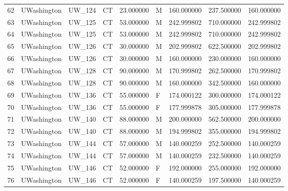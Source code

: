 \begin{tabular}{llllrlrrr}
62     &     UWashington &       UW\_124 &                 CT &  23.000000 &        M &       160.000000 &    237.500000 &  160.000000 \\
63     &     UWashington &       UW\_125 &                 CT &  53.000000 &        M &       242.999802 &    710.000000 &  242.999802 \\
64     &     UWashington &       UW\_125 &                 CT &  53.000000 &        M &       242.999802 &    710.000000 &  242.999802 \\
65     &     UWashington &       UW\_126 &                 CT &  30.000000 &        M &       202.999802 &    622.500000 &  202.999802 \\
66     &     UWashington &       UW\_126 &                 CT &  30.000000 &        M &       160.000000 &    230.000000 &  160.000000 \\
67     &     UWashington &       UW\_128 &                 CT &  90.000000 &        M &       170.999802 &    262.500000 &  170.999802 \\
68     &     UWashington &       UW\_128 &                 CT &  90.000000 &        M &       160.000000 &    342.500000 &  160.000000 \\
69     &     UWashington &       UW\_136 &                 CT &  55.000000 &        F &       174.000122 &    300.000000 &  174.000122 \\
70     &     UWashington &       UW\_136 &                 CT &  55.000000 &        F &       177.999878 &    305.000000 &  177.999878 \\
71     &     UWashington &       UW\_140 &                 CT &  88.000000 &        M &       200.000000 &    562.500000 &  200.000000 \\
72     &     UWashington &       UW\_140 &                 CT &  88.000000 &        M &       194.999802 &    355.000000 &  194.999802 \\
73     &     UWashington &       UW\_144 &                 CT &  57.000000 &        M &       140.000259 &    252.500000 &  140.000259 \\
74     &     UWashington &       UW\_144 &                 CT &  57.000000 &        M &       140.000259 &    232.500000 &  140.000259 \\
75     &     UWashington &       UW\_146 &                 CT &  52.000000 &        F &       192.000000 &    255.000000 &  192.000000 \\
76     &     UWashington &       UW\_146 &                 CT &  52.000000 &        F &       140.000259 &    197.500000 &  140.000259 \\

\end{tabular}
